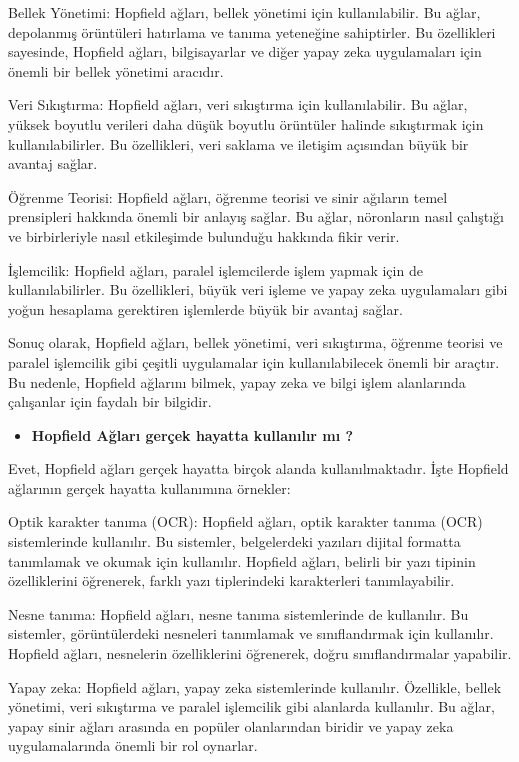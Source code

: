 \documentclass[11pt]{article}
\begin{document}
Bellek Yönetimi: Hopfield ağları, bellek yönetimi için kullanılabilir. Bu ağlar, depolanmış örüntüleri hatırlama ve tanıma yeteneğine sahiptirler. Bu özellikleri sayesinde, Hopfield ağları, bilgisayarlar ve diğer yapay zeka uygulamaları için önemli bir bellek yönetimi aracıdır.

Veri Sıkıştırma: Hopfield ağları, veri sıkıştırma için kullanılabilir. Bu ağlar, yüksek boyutlu verileri daha düşük boyutlu örüntüler halinde sıkıştırmak için kullanılabilirler. Bu özellikleri, veri saklama ve iletişim açısından büyük bir avantaj sağlar.

Öğrenme Teorisi: Hopfield ağları, öğrenme teorisi ve sinir ağıların temel prensipleri hakkında önemli bir anlayış sağlar. Bu ağlar, nöronların nasıl çalıştığı ve birbirleriyle nasıl etkileşimde bulunduğu hakkında fikir verir.

İşlemcilik: Hopfield ağları, paralel işlemcilerde işlem yapmak için de kullanılabilirler. Bu özellikleri, büyük veri işleme ve yapay zeka uygulamaları gibi yoğun hesaplama gerektiren işlemlerde büyük bir avantaj sağlar.

Sonuç olarak, Hopfield ağları, bellek yönetimi, veri sıkıştırma, öğrenme teorisi ve paralel işlemcilik gibi çeşitli uygulamalar için kullanılabilecek önemli bir araçtır. Bu nedenle, Hopfield ağlarını bilmek, yapay zeka ve bilgi işlem alanlarında çalışanlar için faydalı bir bilgidir.

\begin{itemize}
    \item \textbf{Hopfield Ağları gerçek hayatta kullanılır mı ?   }
\end{itemize}

Evet, Hopfield ağları gerçek hayatta birçok alanda kullanılmaktadır. İşte Hopfield ağlarının gerçek hayatta kullanımına örnekler:

Optik karakter tanıma (OCR): Hopfield ağları, optik karakter tanıma (OCR) sistemlerinde kullanılır. Bu sistemler, belgelerdeki yazıları dijital formatta tanımlamak ve okumak için kullanılır. Hopfield ağları, belirli bir yazı tipinin özelliklerini öğrenerek, farklı yazı tiplerindeki karakterleri tanımlayabilir.

Nesne tanıma: Hopfield ağları, nesne tanıma sistemlerinde de kullanılır. Bu sistemler, görüntülerdeki nesneleri tanımlamak ve sınıflandırmak için kullanılır. Hopfield ağları, nesnelerin özelliklerini öğrenerek, doğru sınıflandırmalar yapabilir.

Yapay zeka: Hopfield ağları, yapay zeka sistemlerinde kullanılır. Özellikle, bellek yönetimi, veri sıkıştırma ve paralel işlemcilik gibi alanlarda kullanılır. Bu ağlar, yapay sinir ağları arasında en popüler olanlarından biridir ve yapay zeka uygulamalarında önemli bir rol oynarlar.
\end{document}
